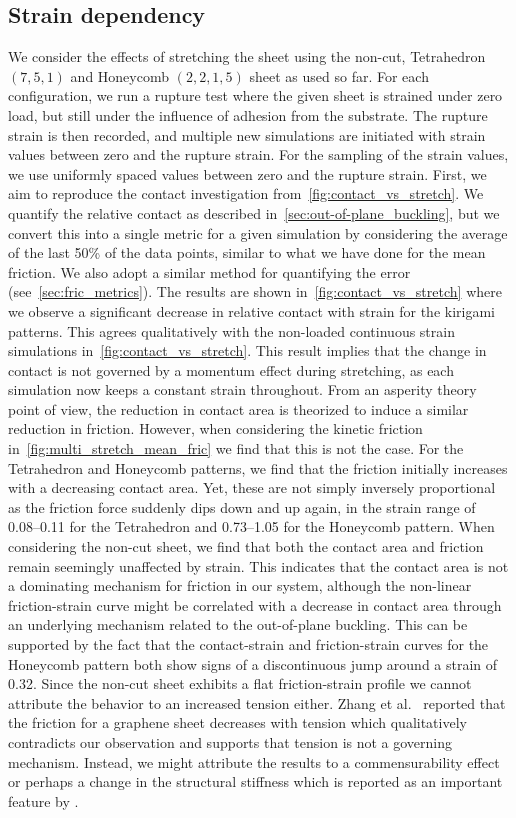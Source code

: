 \subsection{Strain dependency}\label{sec:stretch_dependency}
We consider the effects of stretching the sheet using the non-cut, Tetrahedron $(7,5,1)$ and Honeycomb $(2,2,1,5)$ sheet as used so far. For each configuration, we run a rupture test where the given sheet is strained under zero load, but still under the influence of adhesion from the substrate. The rupture strain is then recorded, and multiple new simulations are initiated with strain values between zero and the rupture strain. For the sampling of the strain values, we use uniformly spaced values between zero and the rupture strain. First, we aim to reproduce the contact investigation from~\cref{fig:contact_vs_stretch}. We quantify the relative contact as described in~\cref{sec:out-of-plane_buckling}, but we convert this into a single metric for a given simulation by considering the average of the last 50\% of the data points, similar
to what we have done for the mean friction. We also adopt a similar method for quantifying the error (see~\cref{sec:fric_metrics}). The results are shown
in~\cref{fig:contact_vs_stretch} where we observe a significant decrease in
relative contact with strain for the kirigami patterns. This agrees qualitatively with the non-loaded continuous strain simulations in~\cref{fig:contact_vs_stretch}. This result implies that the change in contact is not governed by a momentum effect during stretching, as each simulation now keeps a constant strain throughout. 
From an asperity theory point of view, the reduction in contact area is
theorized to induce a similar reduction in friction. However, when considering
the kinetic friction in~\cref{fig:multi_stretch_mean_fric} we find that this is
not the case. For the Tetrahedron and Honeycomb patterns, we find that the
friction initially increases with a decreasing contact area. Yet, these are not
simply inversely proportional as the friction force suddenly dips down and up
again, in the strain range of 0.08--0.11 for the Tetrahedron and 0.73--1.05 for
the Honeycomb pattern. When considering the non-cut sheet, we find that both the
contact area and friction remain seemingly unaffected by strain. This indicates
that the contact area is not a dominating mechanism for friction in our system,
although the non-linear friction-strain curve might be correlated with a
decrease in contact area through an underlying mechanism related to the out-of-plane buckling. This can be supported
by the fact that the contact-strain and friction-strain curves for the Honeycomb
pattern both show signs of a discontinuous jump around a strain of 0.32. Since
the non-cut sheet exhibits a flat friction-strain profile we cannot attribute
the behavior to an increased tension either. Zhang et
al.~\cite{zhang_tuning_2019} reported that the friction for a graphene sheet
decreases with tension which qualitatively contradicts our observation and
supports that tension is not a governing mechanism. Instead,
we might attribute the results to a commensurability effect or perhaps a change in the
structural stiffness which is reported as an important feature by
\cite{Kim_2012}. 

